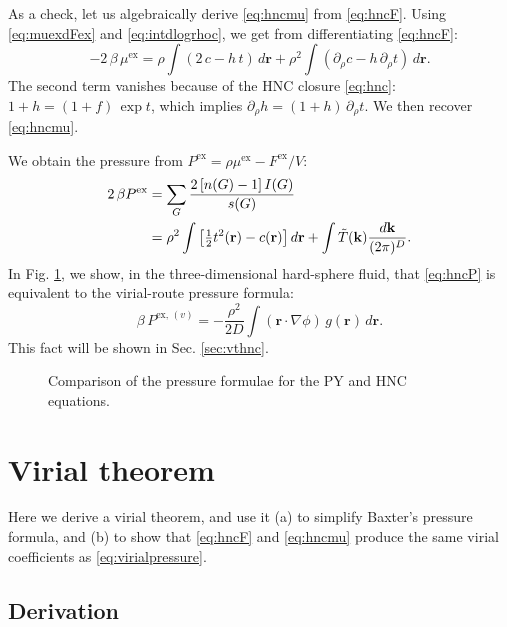 \documentclass[preprint]{revtex4-1}
\newcommand{\vct}[1]{\mathbf{#1}}
\providecommand{\vr}{} %
\renewcommand{\vr}{\vct{r}}
\newcommand{\vk}{\vct{k}}
\newcommand{\dvk}{\frac{d\vk}{(2\pi)^D}}
\newcommand{\supex}[1]{ { { #1 }^{ \mathrm{ex} } } }
\newcommand{\supexv}[1]{ { { #1 }^{ \mathrm{ex}, \, (v) } } }
\newcommand{\Pex}{\supex{P}}
\newcommand{\Pexv}{\supexv{P}}
\newcommand{\Fex}{\supex{F}}
\newcommand{\muex}{\supex{\mu}}
\begin{document}
As a check, let us algebraically derive \eqref{eq:hncmu} from \eqref{eq:hncF}.
%
Using \eqref{eq:muexdFex} and \eqref{eq:intdlogrhoc},
we get from differentiating \eqref{eq:hncF}:
\[
  -2 \, \beta \, \muex = \rho \int (2\,c - h \, t) \, d\vr
  + \rho^2 \int (\partial_\rho c - h \, \partial_\rho t) \, d\vr.
\]
The second term vanishes because of the HNC closure \eqref{eq:hnc}:
$1+h = (1+f) \, \exp t$,
%
  which implies $\partial_\rho h = (1+ h) \, \partial_\rho t$.
%
We then recover \eqref{eq:hncmu}.



We obtain the pressure from
  $\Pex = \rho \muex - \Fex/V$:
%
\begin{align}
2 \, \beta \Pex
&=
\sum_G \frac{ 2 \, [n(G) - 1] \, I(G) } { s(G) }
\notag \\
&=
\rho^2 \int
  \left[
    \tfrac{1}{2} t^2(\vr) - c(\vr)
  \right] d\vr
  +\int \tilde T(\vk) \dvk.
\label{eq:hncP}
\end{align}
%
In Fig. \ref{fig:iepres},
we show, in the three-dimensional hard-sphere fluid,
that
\eqref{eq:hncP}
is equivalent to the virial-route pressure formula:
\begin{equation}
  \beta \, \Pexv
=
  - \frac{\rho^2}{2D}
  \int (\vr \cdot \nabla\phi) \, g(\vr) \, d\vr.
\label{eq:virialpressure}
\end{equation}
%
This fact will be shown in Sec. \ref{sec:vthnc}.

\begin{figure}[h]
  \caption{\label{fig:iepres}
  Comparison of the pressure formulae for the PY and HNC equations.}
\end{figure}





\section{Virial theorem}

Here we derive a virial theorem,
and use it
(a) to simplify Baxter's pressure formula,
and
(b) to show that \eqref{eq:hncF} and \eqref{eq:hncmu}
produce the same virial coefficients as \eqref{eq:virialpressure}.



\subsection{Derivation}
\end{document}
